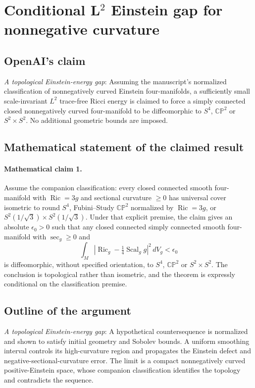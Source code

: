 \documentclass[11pt]{article}
\begin{document}
\section*{Conditional L\({}^{2}\) Einstein gap for nonnegative curvature}

\subsection{OpenAI's claim}
\textit{A topological Einstein-energy gap}: Assuming the manuscript's normalized classification of nonnegatively curved Einstein four-manifolds, a sufficiently small scale-invariant $L^2$ trace-free Ricci energy is claimed to force a simply connected closed nonnegatively curved four-manifold to be diffeomorphic to $S^4$, $\mathbb{CP}^2$ or $S^2\times S^2$. No additional geometric bounds are imposed.

\subsection{Mathematical statement of the claimed result}
\paragraph{Mathematical claim 1.} Assume the companion classification: every closed connected smooth four-manifold with $\operatorname{Ric}=3g$ and sectional curvature $\ge0$ has universal cover isometric to round $S^4$, Fubini--Study $\mathbb{CP}^2$ normalized by $\operatorname{Ric}=3g$, or $S^2(1/\sqrt3)\times S^2(1/\sqrt3)$. Under that explicit premise, the claim gives an absolute $\epsilon_0>0$ such that any closed connected simply connected smooth four-manifold with $\sec_g\ge0$ and \[\int_M\left|\operatorname{Ric}_g-\tfrac14\operatorname{Scal}_g g\right|^2\,dV_g<\epsilon_0\] is diffeomorphic, without specified orientation, to $S^4$, $\mathbb{CP}^2$ or $S^2\times S^2$. The conclusion is topological rather than isometric, and the theorem is expressly conditional on the classification premise.

\subsection{Outline of the argument}
\textit{A topological Einstein-energy gap}: A hypothetical countersequence is normalized and shown to satisfy initial geometry and Sobolev bounds. A uniform smoothing interval controls its high-curvature region and propagates the Einstein defect and negative-sectional-curvature error. The limit is a compact nonnegatively curved positive-Einstein space, whose companion classification identifies the topology and contradicts the sequence.
\end{document}

